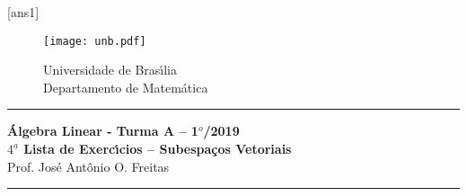 \documentclass[12pt]{exam}
\newtheorem{exercicio}{}
\newcommand{\cp}[1]{\mathbb{#1}}
\newcommand{\vesp}[1]{\vspace{ #1  cm}}
\begin{document}
\pagestyle{empty}

[ans1]

\begin{figure}[h]
        \begin{minipage}[c]{1.7cm}
        \texttt{[image: unb.pdf]}
        \end{minipage}%
        \hspace{0pt}
        \begin{minipage}[c]{4in}
          {Universidade de Bras{\'\i}lia} \\
          {Departamento de Matem{\'a}tica}
\end{minipage}
\end{figure}

\vesp{-0.35} \hrule

\begin{center}
{\Large\bf \'Algebra Linear - Turma A -- 1$^{o}$/2019} \\ \vspace{9pt} {\large\bf
  $4^{\underline{a}}$ Lista de Exerc{\'\i}cios -- Subespa\c{c}os Vetoriais}\\ \vspace{9pt} Prof. Jos{\'e} Ant{\^o}nio O. Freitas
\end{center}
\hrule

\vesp{.6}


\end{document}
